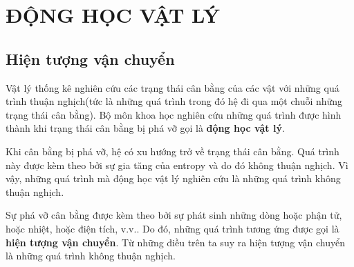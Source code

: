 
\chapter{ĐỘNG HỌC VẬT LÝ}\label{chap:16}
\section{Hiện tượng vận chuyển}\label{sec:16_1}
Vật lý thống kê nghiên cứu các trạng thái cân bằng của các vật với những quá trình thuận nghịch(tức là những quá trình trong đó hệ đi qua một chuỗi những trạng thái cân bằng). Bộ môn khoa học nghiên cứu những quá trình được hình thành khi trạng thái cân bằng bị phá vỡ gọi là \textbf{động học vật lý}.

Khi cân bằng bị phá vỡ, hệ có xu hướng trở về trạng thái cân bằng. Quá trình này được kèm theo bởi sự gia tăng của entropy và do đó không thuận nghịch. Vì vậy, những quá trình mà động học vật lý nghiên cứu là những quá trình không thuận nghịch.

Sự phá vỡ cân bằng được kèm theo bởi sự phát sinh những dòng hoặc phận tử, hoặc nhiệt, hoặc điện tích, v.v.. Do đó, những quá trình tương ứng được gọi là \textbf{hiện tượng vận chuyển}. Từ những điều trên ta suy ra hiện tượng vận chuyển là những quá trình không thuận nghịch.

